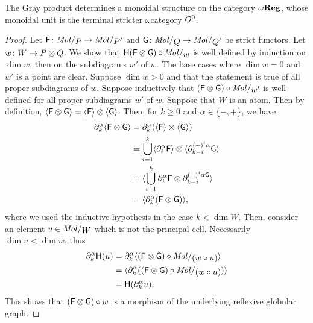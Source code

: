 \begin{cor} \label{cor:gray_product_of_stricter_regular_complex}
    The Gray product determines a monoidal structure on the category \( \omega\mathbf{Reg} \), whose monoidal unit is the terminal stricter \( \omega \)\nbd category \( O^{0} \).
\end{cor}
\begin{proof}
    Let \( \F \colon \molecin{P} \to \molecin{P'} \) and \( \G \colon \molecin{Q} \to \molecin{Q'} \) be strict functors.
    Let \( w \colon W \to P \otimes Q \).
    We show that \( \fun{H} (\F \gray \G) \after \molecin{w} \) is well defined by induction on \( \dim w \), then on the subdiagrams \( w' \) of \( w \).
    The base cases where \( \dim w = 0 \) and \( w' \) is a point are clear.
    Suppose \( \dim w > 0 \) and that the statement is true of all proper subdiagrams of \( w \).
    Suppose inductively that \( (\F \gray \G) \after \molecin{w'} \) is well defined for all proper subdiagrams \( w' \) of \( w \).
    Suppose that \( W \) is an atom.
    Then by definition, \( \langle\mathsf{F} \otimes \mathsf{G}\rangle = \langle\mathsf{F}\rangle \otimes \langle\mathsf{G}\rangle \).
    Then, for \( k \geq 0 \) and \( \alpha \in \left\{ {-, +} \right\} \), we have
    \begin{align*}
        \partial_{k}^{\alpha} \langle\mathsf{F} \otimes \mathsf{G}\rangle &= \partial_{k}^{\alpha} (\langle\mathsf{F}\rangle \otimes \langle\mathsf{G}\rangle) \\
                                       &= \bigcup_{i = 1}^k \langle\partial_{i}^{\alpha} \mathsf{F}\rangle \otimes \langle\partial_{k - i}^{(-)^i\alpha} \mathsf{G}\rangle \\
                                       &= \langle\bigcup_{i = 1}^k \partial_{i}^{\alpha} \mathsf{F} \otimes \partial_{k - i}^{(-)^i\alpha \mathsf{G}}\rangle \\
                                       &= \langle\partial_{k}^{\alpha} (\mathsf{F} \otimes \mathsf{G})\rangle,
    \end{align*}
    where we used the inductive hypothesis in the case \( k < \dim W \).
    Then, consider an element \( u \in \molecin{W} \) which is not the principal cell. 
    Necessarily \( \dim u < \dim w \), thus
    \begin{align*}
        \bd{k}{\a} \fun{H}(u) &= \bd{k}{\a} \pcell{(\F \gray \G) \after \molecin{(w \after u)}} \\
                                                         &= \pcell{\bd{k}{\a} ((\F \gray \G) \after \molecin{(w \after u)})} \\
                                                         &= \fun{H}(\bd{k}{\a} u).
    \end{align*}
    This shows that \( (\mathsf{F} \otimes \mathsf{G}) \circ w \) is a morphism of the underlying reflexive globular graph. 

\end{proof}
